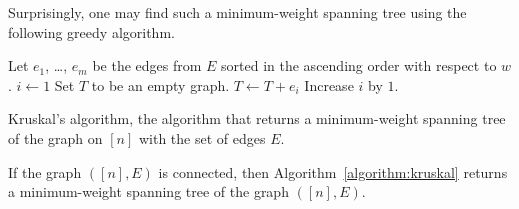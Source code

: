 Surprisingly, one may find such a minimum-weight spanning tree using the
following greedy algorithm.
\begin{algorithm}
  \begin{algorithmic}[1]
      \State Let $e_1$, \dots, $e_m$ be the edges from $E$ sorted in the
        ascending order with respect to $w$.
      \State $i \gets 1$
      \State Set $T$ to be an empty graph.
          \State $T \gets T + e_i$
        \EndIf
        \State Increase $i$ by $1$.
      \EndWhile
      \State {}
    \EndFunction
  \end{algorithmic}
  \caption{Kruskal's algorithm, the algorithm that returns a minimum-weight
  spanning tree of the graph on $[n]$ with the set of edges $E$.}
  \label{algorithm:kruskal}
\end{algorithm}

\begin{theorem}
  If the graph $([n], E)$ is connected, then Algorithm~\ref{algorithm:kruskal}
  returns a minimum-weight spanning tree of the graph $([n], E)$.
\end{theorem}
